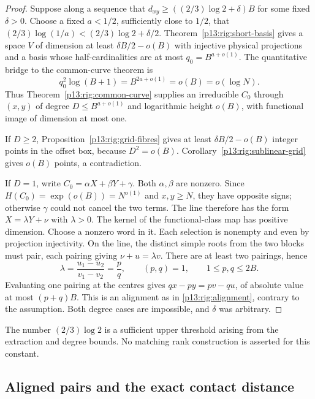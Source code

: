\begin{proof}
Suppose along a sequence that
$d_{xy}\ge((2/3)\log2+\delta)B$ for some fixed
$\delta>0$.  Choose a fixed $a<1/2$, sufficiently close to
$1/2$, that
$(2/3)\log(1/a)<(2/3)\log2+\delta/2$.
Theorem~\ref{p13:rig:short-basis} gives a space $V$
of dimension at least $\delta B/2-o(B)$ with injective
physical projections and a basis whose half-cardinalities
are at most $q_0=B^{a+o(1)}$.  The quantitative bridge to
the common-curve theorem is
\begin{equation}
              q_0^2\log(B+1)=B^{2a+o(1)}=o(B)=o(\log N).
 \label{p13:rig:threshold-bridge}
\end{equation}
Thus Theorem~\ref{p13:rig:common-curve} supplies an
irreducible $C_0$ through $(x,y)$ of degree
$D\le B^{a+o(1)}$ and logarithmic height $o(B)$, with
functional image of dimension at most one.

If $D\ge2$, Proposition~\ref{p13:rig:grid-fibres} gives
at least $\delta B/2-o(B)$ integer points in the offset
box, because $D^2=o(B)$.  Corollary~\ref{p13:rig:sublinear-grid}
gives $o(B)$ points, a contradiction.

If $D=1$, write $C_0=\alpha X+\beta Y+\gamma$.
Both $\alpha,\beta$ are nonzero.  Since
$H(C_0)=\exp(o(B))=N^{o(1)}$ and $x,y\ge N$, they have
opposite signs; otherwise $\gamma$ could not cancel the
two terms.  The line therefore has the form
$X=\lambda Y+\nu$ with $\lambda>0$.
The kernel of the functional-class map has positive
dimension.  Choose a nonzero word in it.  Each selection
is nonempty and even by projection injectivity.  On the
line, the distinct simple roots from the two blocks must
pair, each pairing giving $\nu+u=\lambda v$.
There are at least two pairings, hence
\[
 \lambda=\frac{u_1-u_2}{v_1-v_2}=\frac pq,
 \qquad (p,q)=1,\qquad 1\le p,q\le2B.
\]
Evaluating one pairing at the centres gives
$qx-py=pv-qu$, of absolute value at most $(p+q)B$.
This is an alignment as in \eqref{p13:rig:alignment},
contrary to the assumption.  Both degree cases are
impossible, and $\delta$ was arbitrary.
\end{proof}

The number $(2/3)\log2$ is a sufficient upper threshold
arising from the extraction and degree bounds.  No matching
rank construction is asserted for this constant.


\subsection{Aligned pairs and the exact contact distance}

